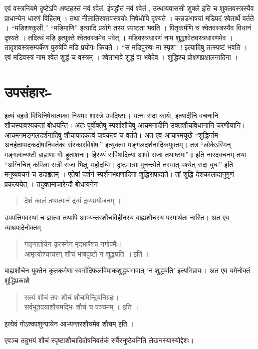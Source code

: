 {एवं वस्त्रनियमे दृष्टेऽपि अष्टहस्तं नवं श्वेतं, ईषद्धौतं नवं श्वेतं , उत्थायवाससी शुक्ले इति च शुक्लवस्त्रस्यैव प्राधान्येन धारणं विहितम् । तथा नीलातिरक्तवस्त्रयोः निषेधोपि दृश्यते । कन्नडभाषयां मडिपदं श्वेतार्थे वर्तते । “मडिशश्कुली,” “मडिमाणि” इत्यादि प्रयोगे तस्य स्पष्टता भवति । पितृकर्मणि च श्वेतवस्त्रस्यैव विधानं दृश्यते । तदित्थं मडि इत्युक्ते श्वेतवस्त्रमेव भवेत् । मडिवस्त्रधारणं नाम शुद्धश्वेतवस्त्रधारणमेव । तादृशवस्त्रसम्पर्केण पुरुषेपि मडि प्रयोगः क्रियते । “स मडिपुरुषः मा स्पृश” ! इत्यादिषु तत्स्पष्टं भवति । एवं मडिवस्त्रं नाम श्वेतं शुद्धं च वस्त्रम् । श्वेताभावे शुद्धं वा भवेदेव । शुद्धिश्च प्रोक्षणप्रक्षालनादिना ।

\section*{उपसंहारः-} 

इत्थं बहवो विधिनिषेधात्मका नियमाः शास्त्रे उपदिष्टाः। यत्नः सदा कार्यः, इत्यादीनि वचनानि शौचस्यावश्यकतां बोधयन्ति। अतः पूर्वोक्तेषु स्पर्शाशौचेषु आचमनादीनि उक्तशौचविधानानि चरणीयानि। आचमनमङ्गलदर्शनादिषु शौचापादकत्वं पावकत्वं च वर्तते। अत एव आचारमयूखे “शुद्धिर्नाम अनर्हतापादकदोषानिवर्तकः संस्कारविशेषः” इत्युक्त्वा मङ्गलदर्शनादिकमुक्तम्। तत्र “लोकेऽस्मिन् मङ्गलान्यष्टौ ब्राह्मणा गौः हुताशनः। हिरण्यं सर्पिषादित्या आपो राजा तथाष्टमः”॥ इति नारदवचनम् तथा “अग्निचित् कपिला सत्री राजा भिक्षुः महोदधिः। दृष्टमात्राः पुनन्त्येते तस्मात् पश्येत् सदा बुधः” इति मनुष्यवचनं च उदाहृतम् । एतेषां दर्शनं स्पर्शनभक्षणादिना शुद्धिरापाद्यते। तां शुद्धिं देशकालाद्यनुगुणं प्रकल्पयेत् । तदुक्तमाचारेन्दौ बोधायनेन 
\begin{verse}
देशं कालं तथात्मानं द्रव्यं द्रव्यप्रयोजनम् । 
\end{verse}
उपपत्तिमवस्थां च ज्ञात्वा तथापि आभ्यन्तरशौचविहीनस्य बाह्यशौचस्य परमार्थता नास्ति। अत एव व्याघ्रपादेनोक्तम् 
\begin{verse}
गङ्गातोयेन कृत्स्नेन मृद्भारैश्च नगोपमैः। \\
आमृत्योश्चाचरन् शौचं भावदुष्टो न शुद्ध्यति ॥ इति ।
\end{verse}
बाह्यशौचेन युक्तेन कृतकर्मणा स्वर्गादिफलविपाकशुद्ध्यभावात् ‘न शुद्ध्यति’ इत्यभिप्रायः। अत एव यमेनोक्तं शुद्धिप्रकाशे 
\begin{verse}
सत्यं शौचं तपः शौचं शौचमिन्द्रियनिग्रहः। \\
सर्वभूतदयाशौचमद्भिः शौचं च पञ्चमम् ॥ इति । 
\end{verse}
इत्येवं गोऽश्वपशुन्यायेन आभ्यन्तरशौचमेव शौचम् इति । 

एवञ्च तदुभयं शौचं स्पृष्टाशौचादिदोषनिवर्तकं सर्वैरनुष्ठेयमिति लेखनस्यास्योद्देशः।

\articleend
}
